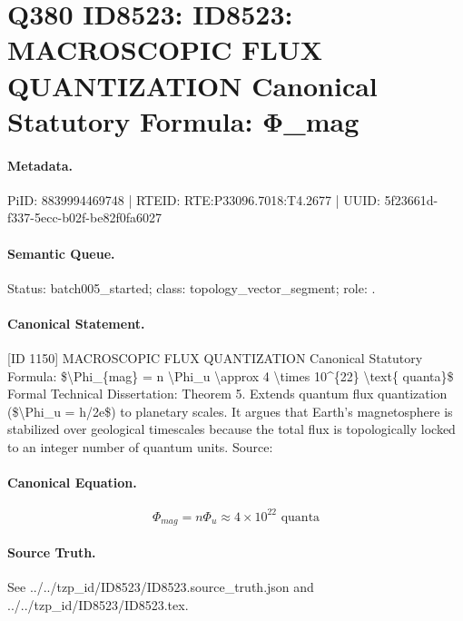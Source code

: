 \section*{Q380 ID8523: ID8523: MACROSCOPIC FLUX QUANTIZATION Canonical Statutory Formula: Φ\_mag}
\paragraph{Metadata.}
PiID: 8839994469748 | RTEID: RTE:P33096.7018:T4.2677 | UUID: 5f23661d-f337-5ecc-b02f-be82f0fa6027

\paragraph{Semantic Queue.}
Status: batch005\_started; class: topology\_vector\_segment; role: .

\paragraph{Canonical Statement.}
[ID 1150] MACROSCOPIC FLUX QUANTIZATION Canonical Statutory Formula: \$\textbackslash{}Phi\_\{mag\} = n \textbackslash{}Phi\_u \textbackslash{}approx 4 \textbackslash{}times 10\textasciicircum{}\{22\} \textbackslash{}text\{ quanta\}\$ Formal Technical Dissertation: Theorem 5. Extends quantum flux quantization (\$\textbackslash{}Phi\_u = h/2e\$) to planetary scales. It argues that Earth's magnetosphere is stabilized over geological timescales because the total flux is topologically locked to an integer number of quantum units. Source:

\paragraph{Canonical Equation.}
\[
\Phi_{mag} = n \Phi_u \approx 4 \times 10^{22} \text{ quanta}
\]

\paragraph{Source Truth.}
See ../../tzp\_id/ID8523/ID8523.source\_truth.json and ../../tzp\_id/ID8523/ID8523.tex.
